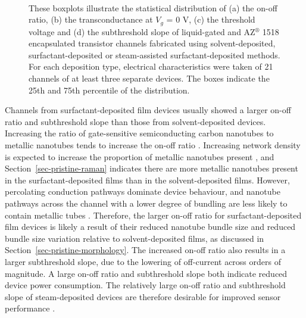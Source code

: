 \documentclass[
  a4paper,
]{scrbook}
\begin{document}
\begin{figure}
\begin{minipage}[t]{0.45\linewidth}
{{}

}

\end{minipage}%
%
\begin{minipage}[t]{0.01\linewidth}

{\centering 

~

}

\end{minipage}%

\caption{\label{fig-sweep-parameters}These boxplots illustrate the
statistical distribution of (a) the on-off ratio, (b) the
transconductance at \(V_g\) = 0 V, (c) the threshold voltage and (d) the
subthreshold slope of liquid-gated and AZ\(^\circledR\) 1518
encapsulated transistor channels fabricated using solvent-deposited,
surfactant-deposited or steam-assisted surfactant-deposited methods. For
each deposition type, electrical characteristics were taken of 21
channels of at least three separate devices. The boxes indicate the 25th
and 75th percentile of the distribution.}

\end{figure}

Channels from surfactant-deposited film devices usually showed a larger
on-off ratio and subthreshold slope than those from solvent-deposited
devices. Increasing the ratio of gate-sensitive semiconducting carbon
nanotubes to metallic nanotubes tends to increase the on-off ratio
\autocite{LeMieux2008,Rouhi2011,Zaumseil2015,Murugathas2018}. Increasing
network density is expected to increase the proportion of metallic
nanotubes present \autocite{Rouhi2011}, and
Section~\ref{sec-pristine-raman} indicates there are more metallic
nanotubes present in the surfactant-deposited films than in the
solvent-deposited films. However, percolating conduction pathways
dominate device behaviour, and nanotube pathways across the channel with
a lower degree of bundling are less likely to contain metallic tubes
\autocite{Murugathas2018}. Therefore, the larger on-off ratio for
surfactant-deposited film devices is likely a result of their reduced
nanotube bundle size and reduced bundle size variation relative to
solvent-deposited films, as discussed in
Section~\ref{sec-pristine-morphology}. The increased on-off ratio also
results in a larger subthreshold slope, due to the lowering of
off-current across orders of magnitude. A large on-off ratio and
subthreshold slope both indicate reduced device power consumption. The
relatively large on-off ratio and subthreshold slope of steam-deposited
devices are therefore desirable for improved sensor performance
\autocite{Kauffman2008,Heller2009,Gao2010}.
\end{document}
